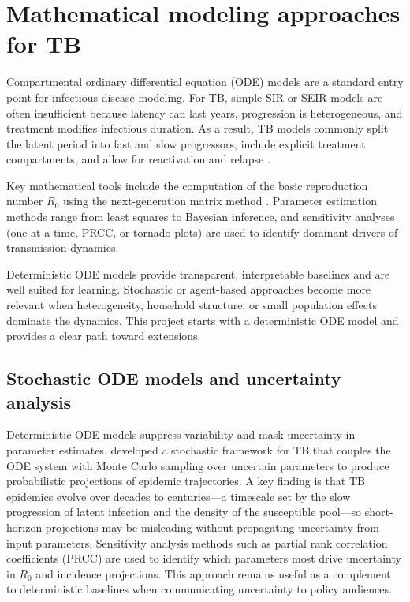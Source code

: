 \documentclass[11pt]{article}
\begin{document}
\section{Mathematical modeling approaches for TB}

Compartmental ordinary differential equation (ODE) models are a standard entry point for infectious disease modeling. For TB, simple SIR or SEIR models are often insufficient because latency can last years, progression is heterogeneous, and treatment modifies infectious duration. As a result, TB models commonly split the latent period into fast and slow progressors, include explicit treatment compartments, and allow for reactivation and relapse \citep{vynnycky1997natural}.

Key mathematical tools include the computation of the basic reproduction number $R_0$ using the next-generation matrix method \citep{diekmann1990r0}. Parameter estimation methods range from least squares to Bayesian inference, and sensitivity analyses (one-at-a-time, PRCC, or tornado plots) are used to identify dominant drivers of transmission dynamics.

Deterministic ODE models provide transparent, interpretable baselines and are well suited for learning. Stochastic or agent-based approaches become more relevant when heterogeneity, household structure, or small population effects dominate the dynamics. This project starts with a deterministic ODE model and provides a clear path toward extensions.

\subsection{Stochastic ODE models and uncertainty analysis}

Deterministic ODE models suppress variability and mask uncertainty in parameter estimates. \citet{blower1995dynamics} developed a stochastic framework for TB that couples the ODE system with Monte Carlo sampling over uncertain parameters to produce probabilistic projections of epidemic trajectories. A key finding is that TB epidemics evolve over decades to centuries---a timescale set by the slow progression of latent infection and the density of the susceptible pool---so short-horizon projections may be misleading without propagating uncertainty from input parameters. Sensitivity analysis methods such as partial rank correlation coefficients (PRCC) are used to identify which parameters most drive uncertainty in $R_0$ and incidence projections. This approach remains useful as a complement to deterministic baselines when communicating uncertainty to policy audiences.
\end{document}
